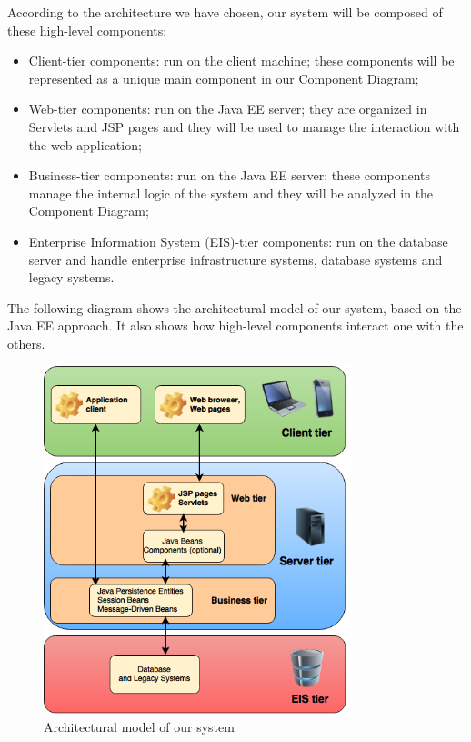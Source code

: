According to the architecture we have chosen, our system will be composed of these high-level components:
\begin{itemize}
    \item Client-tier components: run on the client machine; these components will be represented as a unique main component in our Component Diagram;
    \item Web-tier components: run on the Java EE server; they are organized in Servlets and JSP pages and they will be used to manage the interaction with the web application;
    \item Business-tier components: run on the Java EE server; these components manage the internal logic of the system and they will be analyzed in the Component Diagram;
    \item Enterprise Information System (EIS)-tier components: run on the database server and handle enterprise infrastructure systems, database systems and legacy systems.
\end{itemize}

The following diagram shows the architectural model of our system, based on the Java EE approach. It also shows how high-level components interact one with the others.

    \begin{figure}[H]
        \centering
        \includegraphics[width=9cm]{./Images/ArchitecturalModel.png}
        \caption{Architectural model of our system}
        \label{architectural-model}
    \end{figure}

